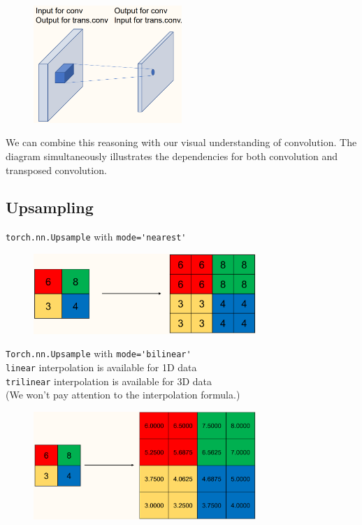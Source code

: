 \documentclass{report}
\begin{document}
\begin{figure}[H]
    \centering
    \includegraphics[width=0.5\textwidth]{.././assets/8.17.png}
\end{figure}

We can combine this reasoning with our visual understanding of convolution. The diagram simultaneously illustrates the dependencies for both convolution and transposed convolution.

\subsection{Upsampling}

\begin{concept}[8.17][Upsampling]
    \verb|torch.nn.Upsample| with \verb|mode='nearest'|

    \begin{figure}[H]
        \centering
        \includegraphics[width=0.75\textwidth]{.././assets/8.18.png}
    \end{figure}
\end{concept}

\begin{concept}[8.18][Upsampling]
    \verb|Torch.nn.Upsample| with \verb|mode='bilinear'|\\
    \verb|linear| interpolation is available for 1D data\\
    \verb|trilinear| interpolation is available for 3D data\\
    (We won't pay attention to the interpolation formula.)

    \begin{figure}[H]
        \centering
        \includegraphics[width=0.75\textwidth]{.././assets/8.19.png}
    \end{figure}
\end{concept}
\end{document}
